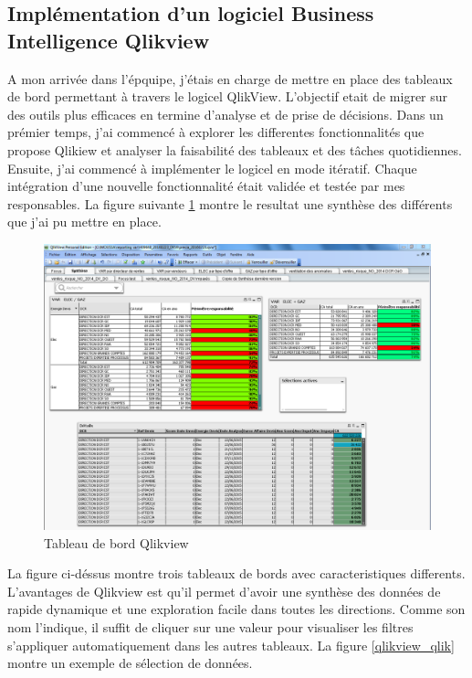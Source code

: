 \documentclass[11pt,a4paper]{article}
\begin{document}
\subsection{Implémentation d'un logiciel Business Intelligence Qlikview}
A mon arrivée dans l'épquipe, j'étais en charge de mettre en place des tableaux de bord permettant  à travers le logicel QlikView. L'objectif etait de migrer sur des outils plus efficaces en termine d'analyse et de prise de décisions. 
Dans un prémier temps, j'ai commencé à explorer les differentes fonctionnalités que propose Qlikiew et analyser la faisabilité des tableaux et des tâches quotidiennes. Ensuite, j'ai commencé à implémenter le logicel en mode itératif. Chaque intégration d'une nouvelle fonctionnalité était validée et testée par mes responsables. La figure suivante \ref{qlikview} montre le resultat une synthèse des différents que j'ai pu mettre en place. 
\begin{figure}[h]
 \centering
 \includegraphics[scale=0.5]{qlik.PNG}
 \caption{Tableau de bord Qlikview}
 \label{qlikview}
\end{figure}

La figure ci-déssus montre trois tableaux de bords avec caracteristiques differents. L'avantages de Qlikview est qu'il permet d'avoir une synthèse des données de rapide dynamique et une exploration facile dans toutes les directions. Comme son nom l'indique, il suffit de cliquer sur une valeur pour visualiser les filtres s'appliquer automatiquement dans les autres tableaux. La figure \ref{qlikview_qlik} montre un exemple de sélection de données.
\end{document}
